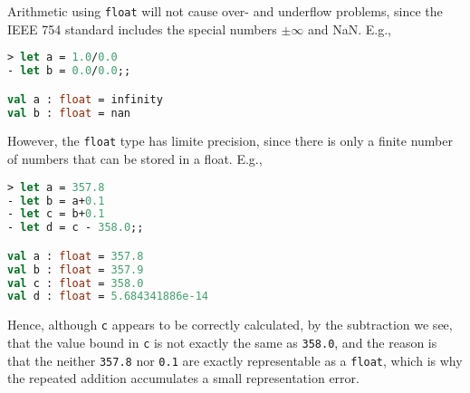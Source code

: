 Arithmetic using \lstinline|float| will not cause over- and underflow problems, since the IEEE 754 standard includes the special numbers $\pm\infty$ and NaN. E.g.,
\begin{lstlisting}[language=fsharp,caption={fsharpi}]
> let a = 1.0/0.0  
- let b = 0.0/0.0;;

val a : float = infinity
val b : float = nan
\end{lstlisting}
However, the \lstinline|float| type has limite precision, since there is only a finite number of numbers that can be stored in a float. E.g.,
\begin{lstlisting}[language=fsharp,caption={fsharpi}]
> let a = 357.8      
- let b = a+0.1      
- let c = b+0.1      
- let d = c - 358.0;;

val a : float = 357.8
val b : float = 357.9
val c : float = 358.0
val d : float = 5.684341886e-14
\end{lstlisting}
Hence, although \lstinline|c| appears to be correctly calculated, by the subtraction we see, that the value bound in \lstinline|c| is not exactly the same as \lstinline|358.0|, and the reason is that the neither \lstinline|357.8| nor \lstinline|0.1| are exactly representable as a \lstinline|float|, which is why the repeated addition accumulates a small representation error.

